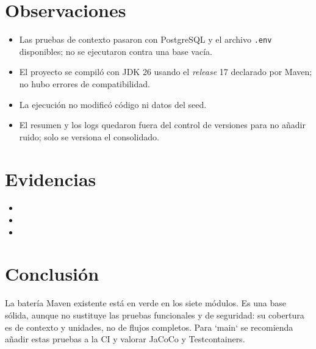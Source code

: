 \documentclass[11pt]{article}
\begin{document}
\section{Observaciones}

\begin{itemize}
  \item Las pruebas de contexto pasaron con PostgreSQL y el archivo
  \texttt{.env} disponibles; no se ejecutaron contra una base vacía.
  \item El proyecto se compiló con JDK 26 usando el \textit{release} 17
  declarado por Maven; no hubo errores de compatibilidad.
  \item La ejecución no modificó código ni datos del seed.
  \item El resumen y los logs quedaron fuera del control de versiones para no
  añadir ruido; solo se versiona el consolidado.
\end{itemize}

\section{Evidencias}

\begin{itemize}
  \item {}
  \item {}
  \item {}
\end{itemize}

\section{Conclusión}

La batería Maven existente está en verde en los siete módulos. Es una base
sólida, aunque no sustituye las pruebas funcionales y de seguridad: su
cobertura es de contexto y unidades, no de flujos completos. Para `main` se
recomienda añadir estas pruebas a la CI y valorar JaCoCo y Testcontainers.
\end{document}
